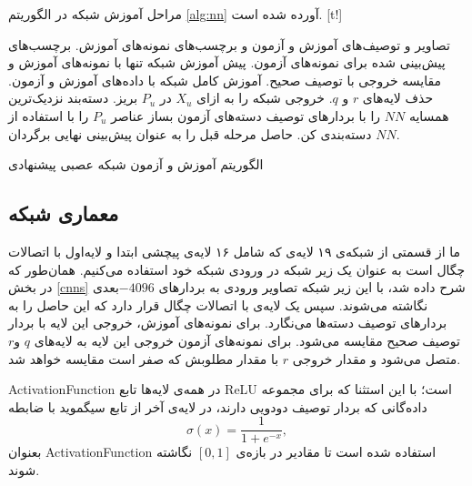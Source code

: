 مراحل آموزش شبکه در الگوریتم \ref{alg:nn} آورده شده است.
[t!]
	\begin{enumerate}[label={\arabic*},itemsep=.1em, parsep=.1em]
 تصاویر و توصیف‌های آموزش و آزمون و برچسب‌های نمونه‌های آموزش.
 برچسب‌های پیش‌بینی شده برای نمونه‌های آزمون.
 پیش آموزش شبکه تنها با نمونه‌های آموزش و مقایسه خروجی با توصیف صحیح.
 آموزش کامل شبکه با داده‌های آموزش و آزمون.
 حذف لایه‌های $r$ و $q$.
 خروجی شبکه را به ازای $X_u$ در $P_u$ بریز.
 دسته‌بند نزدیک‌ترین همسایه $NN$ را با بردارهای توصیف دسته‌های آزمون بساز
 عناصر $P_u$ را با استفاده از $NN$ دسته‌بندی کن.
 حاصل مرحله قبل را به عنوان پیش‌بینی نهایی برگردان.
\end{enumerate}
\caption{الگوریتم آموزش و آزمون شبکه عصبی پیشنهادی}
\label{alg:nn}
\subsection{معماری شبکه}\label{net_architechture}
ما از قسمتی از شبکه‌ی ۱۹ لایه‌ی  \cite{vgg} که شامل ۱۶ لایه‌ی پیچشی ابتدا و لایه‌‌‌اول با اتصالات چگال است به عنوان یک زیر شبکه در ورودی شبکه خود استفاده می‌کنیم. همان‌طور که در بخش
\ref{cnns}
شرح داده شد،
 با این زیر شبکه تصاویر ورودی به بردارهای $-4096$بعدی نگاشته می‌شوند.
  سپس یک لایه‌ی با اتصالات چگال قرار دارد که این حاصل را به بردارهای توصیف دسته‌ها می‌نگارد. برای نمونه‌های آموزش، خروجی این لایه با بردار توصیف صحیح مقایسه می‌شود. برای نمونه‌های آزمون خروجی این لایه به  لایه‌های  $q$ و$r$ متصل می‌شود و مقدار خروجی $r$ با مقدار مطلوبش که صفر است مقایسه خواهد شد.

\gls{ActivationFunction} در همه‌ی لایه‌ها تابع \gls{ReLU} است؛ با این استثنا که برای مجموعه‌ داده‌گانی که بردار توصیف دودویی دارند، در لایه‌ی آخر از تابع سیگموید با ضابطه
\begin{equation}
\sigma(x) = \frac{1}{1 + e^{-x}},
\end{equation}
بعنوان \gls{ActivationFunction} استفاده شده است تا مقادیر در بازه‌ی $[0,1]$ نگاشته شوند.

